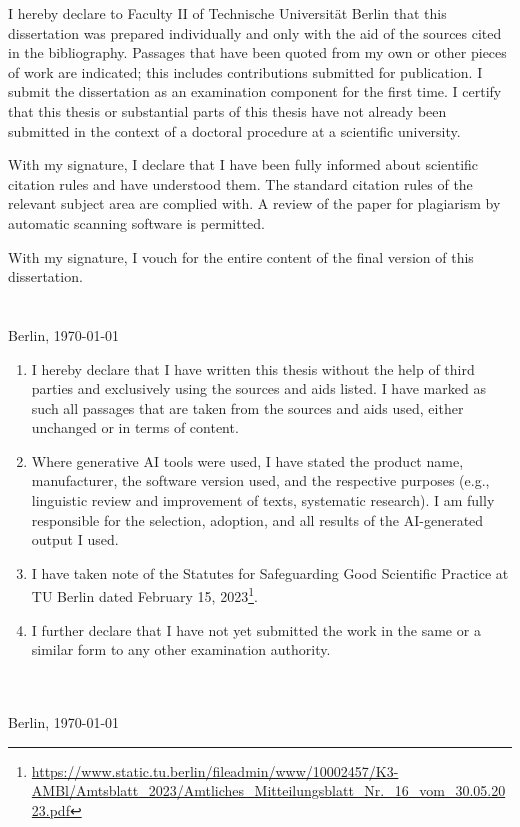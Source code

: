 
I hereby declare to Faculty II of Technische Universität Berlin that this dissertation was prepared individually and only with the aid of the sources cited in the bibliography. Passages that have been quoted from my own or other pieces of work are indicated; this includes contributions submitted for publication. I submit the dissertation as an examination component for the first time. I certify that this thesis or substantial parts of this thesis have not already been submitted in the context of a doctoral procedure at a scientific university. 

With my signature, I declare that I have been fully informed about scientific citation rules and have understood them. The standard citation rules of the relevant subject area are complied with. A review of the paper for plagiarism by automatic scanning software is permitted. 

With my signature, I vouch for the entire content of the final version of this dissertation.\\[2cm]
\makebox[2.5in][l]{\hrulefill}\\
\textsc{\autor} \\
Berlin, \today 

\clearpage
\begin{enumerate}[noitemsep]
\item I hereby declare that I have written this thesis without the help of third parties and exclusively using the sources and aids listed. I have marked as such all passages that are taken from the sources and aids used, either unchanged or in terms of content.
\vspace{4 pt}
\item Where generative AI tools were used, I have stated the product name, manufacturer, the software version used, and the respective purposes (e.g., linguistic review and improvement of texts, systematic research). I am fully responsible for the selection, adoption, and all results of the AI-generated output I used.
\vspace{4 pt}
\item I have taken note of the Statutes for Safeguarding Good Scientific Practice at TU Berlin dated February 15, 2023\footnote{\url{https://www.static.tu.berlin/fileadmin/www/10002457/K3-AMBl/Amtsblatt_2023/Amtliches_Mitteilungsblatt_Nr._16_vom_30.05.2023.pdf}}.
\vspace{4 pt}
\item I further declare that I have not yet submitted the work in the same or a similar form to any other examination authority.

\end{enumerate}
\vspace*{4ex}
\makebox[3in][l]{\hrulefill}\\
\textsc{\autor} \\
Berlin, \today